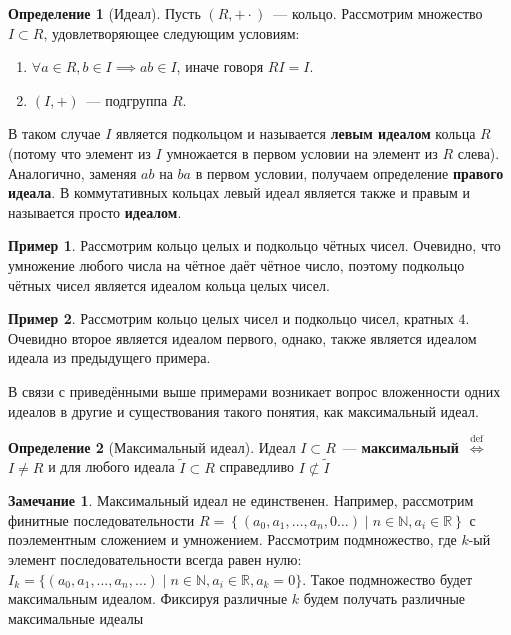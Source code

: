 \documentclass[12pt]{extarticle}
\theoremstyle{definition}
\newtheorem{definition}{\indent Определение}[section]
\newtheorem*{example}{\indent Пример}%
\newtheorem*{remark}{\indent Замечание}
\newcommand{\RR}{\mathbb{R}}
\newcommand{\NN}{\mathbb{N}}
\newcommand{\iffdef}{\stackrel{\mathrm{def}}{\iff}}
\begin{document}
    \begin{definition}[Идеал]\label{def:Ideal}
        Пусть $(R,+\cdot)$~--- кольцо. Рассмотрим множество $I\subset R$, удовлетворяющее следующим условиям:
        \begin{enumerate}
            \item $\forall a\in R, b\in I \implies ab\in I$, иначе говоря $RI=I$.
            \item $(I,+)$~--- подгруппа $R$.
        \end{enumerate}

        В таком случае $I$ является подкольцом и называется \textbf{левым идеалом} кольца $R$ (потому что элемент из $I$ умножается в первом условии на элемент из $R$ слева). Аналогично, заменяя $ab$ на $ba$ в первом условии, получаем определение \textbf{правого идеала}. В коммутативных кольцах левый идеал является также и правым и называется просто \textbf{идеалом}.
    \end{definition}
    \begin{example}
        Рассмотрим кольцо целых и подкольцо чётных чисел. Очевидно, что умножение любого числа на чётное даёт чётное число, поэтому подкольцо чётных чисел является идеалом кольца целых чисел.
    \end{example}
    \begin{example}
        Рассмотрим кольцо целых чисел и подкольцо чисел, кратных $4$. Очевидно второе является идеалом первого, однако, также является идеалом идеала из предыдущего примера.
    \end{example}
    В связи с приведёнными выше примерами возникает вопрос вложенности одних идеалов в другие и существования такого понятия, как максимальный идеал.
    \begin{definition}[Максимальный идеал]\label{def:Maximal ideal}
        Идеал $I\subset R$~--- \textbf{максимальный}~$\iffdef$ $I\ne R$ и для любого идеала $\tilde I\subset R$ справедливо $I\nsubset \tilde I$
    \end{definition}
    \begin{remark}
        Максимальный идеал не единственен. Например, рассмотрим финитные последовательности $R=\left\{(a_0,a_1,\dots,a_n,0\dots)\mid n\in\NN, a_i\in\RR\right\}$ с поэлементным сложением и умножением. Рассмотрим подмножество, где $k$-ый элемент последовательности всегда равен нулю: $I_k=\{(a_0,a_1,\dots,a_n,\dots)\mid n\in\NN,a_i\in\RR,a_k=0\}$. Такое подмножество будет максимальным идеалом. Фиксируя различные $k$ будем получать различные максимальные идеалы
    \end{remark}
\end{document}
